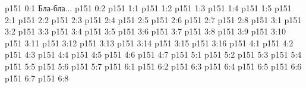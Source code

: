 \author{Промежуточные создания}
\vs p151 0:1  Бла-бла...
\vs p151 0:2 
\vs p151 1:1 
\vs p151 1:2 \pc 
\vs p151 1:3 \pc 
\vs p151 1:4 
\vs p151 1:5 
\vs p151 2:1 
\vs p151 2:2 
\vs p151 2:3 
\vs p151 2:4 
\vs p151 2:5 
\vs p151 2:6 
\vs p151 2:7 
\vs p151 2:8 
\vs p151 3:1 
\vs p151 3:2 \pc 
\vs p151 3:3 
\vs p151 3:4 
\vs p151 3:5 
\vs p151 3:6 
\vs p151 3:7 
\vs p151 3:8 
\vs p151 3:9 
\vs p151 3:10 
\vs p151 3:11 
\vs p151 3:12 \pc 
\vs p151 3:13 \pc 
\vs p151 3:14 
\vs p151 3:15 
\vs p151 3:16 
\vs p151 4:1 
\vs p151 4:2 \pc 
\vs p151 4:3 \pc 
\vs p151 4:4 \pc 
\vs p151 4:5 \pc 
\vs p151 4:6 \pc 
\vs p151 4:7 \pc 
{}
\vs p151 5:1 
\vs p151 5:2 
\vs p151 5:3 
\vs p151 5:4 
\vs p151 5:5 
\vs p151 5:6 
\vs p151 5:7 
\vs p151 6:1 
\vs p151 6:2 
\vs p151 6:3 
\vs p151 6:4 
\vs p151 6:5 
\vs p151 6:6 
\vs p151 6:7 \pc 
\vs p151 6:8 
\quizlink

